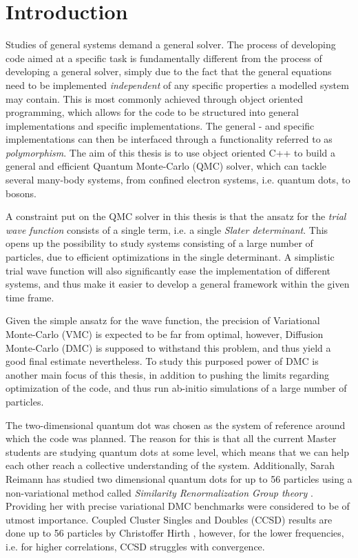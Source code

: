 \chapter{Introduction}

Studies of general systems demand a general solver. The process of developing code aimed at a specific task is fundamentally different from the process of developing a general solver, simply due to the fact that the general equations need to be implemented \textit{independent} of any specific properties a modelled system may contain. This is most commonly achieved through object oriented programming, which allows for the code to be structured into general implementations and specific implementations. The general - and specific implementations can then be interfaced through a functionality referred to as \textit{polymorphism}. The aim of this thesis is to use object oriented C++ to build a general and efficient Quantum Monte-Carlo (QMC) solver, which can tackle several many-body systems, from confined electron systems, i.e. quantum dots, to bosons.  

A constraint put on the QMC solver in this thesis is that the ansatz for the \textit{trial wave function} consists of a single term, i.e. a single \textit{Slater determinant}. This opens up the possibility to study systems consisting of a large number of particles, due to efficient optimizations in the single determinant. A simplistic trial wave function will also  significantly ease the implementation of different systems, and thus make it easier to develop a general framework within the given time frame.

Given the simple ansatz for the wave function, the precision of Variational Monte-Carlo (VMC) is expected to be far from optimal, however, Diffusion Monte-Carlo (DMC) is supposed to withstand this problem, and thus yield a good final estimate nevertheless. To study this purposed power of DMC is another main focus of this thesis, in addition to pushing the limits regarding optimization of the code, and thus run ab-initio simulations of a large number of particles.

The two-dimensional quantum dot was chosen as the system of reference around which the code was planned. The reason for this is that all the current Master students are studying quantum dots at some level, which means that we can help each other reach a collective understanding of the system. Additionally, Sarah Reimann has studied two dimensional quantum dots for up to 56 particles using a non-variational method called \textit{Similarity Renormalization Group theory} \cite{verdensBesteArtikkel}. Providing her with precise variational DMC benchmarks were considered to be of utmost importance. Coupled Cluster Singles and Doubles (CCSD) results are done up to 56 particles by Christoffer Hirth \cite{Hirth}, however, for the lower frequencies, i.e. for higher correlations, CCSD struggles with convergence.   

